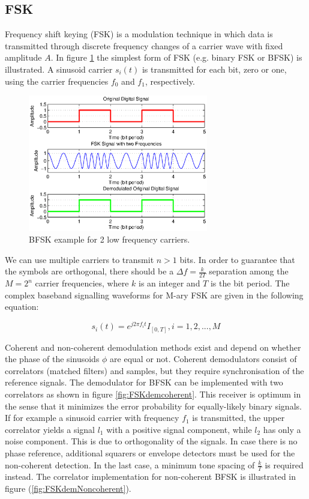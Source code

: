 \documentclass[12pt,a4paper,openright]{report}
\begin{document}
\subsection{FSK}
\label{subsec:fsk}
Frequency shift keying (FSK) is a modulation technique in which data is transmitted through discrete frequency changes of a carrier wave with fixed amplitude $A$.  In figure \ref{fig:fskex} the simplest form of FSK (e.g. binary FSK or BFSK) is illustrated. A sinusoid carrier $s_i(t)$ is transmitted for each bit, zero or one, using the carrier frequencies $f_0$ and $f_1$, respectively. 

\begin{figure}[H]
  \centering
    \includegraphics[width=0.7\textwidth]{fskexample.eps}
    \caption[BFSK example]{BFSK example for 2 low frequency carriers.}
    \label{fig:fskex}
\end{figure}

We can use multiple carriers to transmit $n>1$ bits. In order to guarantee that the symbols are orthogonal, there should be a $\Delta f=\frac{k}{2T}$ separation among the  $M=2^n$ carrier frequencies, where $k$ is an integer and $T$ is the bit period. The complex baseband signalling waveforms for M-ary FSK \cite{Madhow} are given in the following equation:

\begin{equation}\label{Eq:M-FSK symbols}
{s_i}(t) = {e^{j2\pi {f_i}t}}{I_{[0,T]}},i = 1,2,...,M
\end{equation}



Coherent and non-coherent demodulation methods exist and depend on whether the phase of the sinusoids $\phi$ are equal or not. Coherent demodulators consist of correlators (matched filters) and samples, but they require synchronisation of the reference signals. The demodulator for BFSK can be implemented with two correlators as shown in figure \ref{fig:FSKdemcoherent}. This receiver is optimum in the sense that it minimizes the error probability for equally-likely binary signals. If for example a sinusoid carrier with frequency $f_1$ is transmitted, the upper correlator yields a signal $l_1$ with a positive signal component, while $l_2$ has only a noise component. This is due to orthogonality of the signals.
  In case there is no phase reference, additional squarers or envelope detectors must be used for the non-coherent detection. In the last case, a minimum tone spacing of $\frac{k}{T}$ is required instead. The correlator implementation for non-coherent BFSK is illustrated in figure (\ref{fig:FSKdemNoncoherent}).
\end{document}
